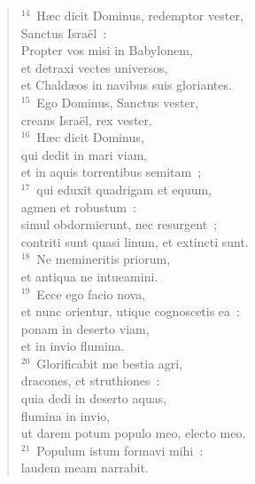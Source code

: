 \begin{flushleft}\begin{verse}${}^{14}$~H\ae c dicit Dominus, redemptor vester,\\ Sanctus Isra\"el~:\\ Propter vos misi in Babylonem,\\ et detraxi vectes universos,\\ et Chald\ae os in navibus suis gloriantes.\\
${}^{15}$~Ego Dominus, Sanctus vester,\\ creans Isra\"el, rex vester.\\
${}^{16}$~H\ae c dicit Dominus,\\ qui dedit in mari viam,\\ et in aquis torrentibus semitam~;\\
${}^{17}$~qui eduxit quadrigam et equum,\\ agmen et robustum~:\\ simul obdormierunt, nec resurgent~;\\ contriti sunt quasi linum, et extincti sunt.\\
${}^{18}$~Ne memineritis priorum,\\ et antiqua ne intueamini.\\
${}^{19}$~Ecce ego facio nova,\\ et nunc orientur, utique cognoscetis ea~:\\ ponam in deserto viam,\\ et in invio flumina.\\
${}^{20}$~Glorificabit me bestia agri,\\ dracones, et struthiones~:\\ quia dedi in deserto aquas,\\ flumina in invio,\\ ut darem potum populo meo, electo meo.\\
${}^{21}$~Populum istum formavi mihi~:\\ laudem meam narrabit.\end{verse}\end{flushleft}


